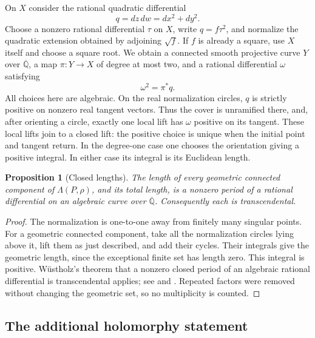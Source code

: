 \documentclass[11pt,a4paper]{article}
\newtheorem{proposition}[theorem]{Proposition}
\theoremstyle{definition}
\theoremstyle{remark}
\numberwithin{equation}{section}
\newcommand{\Qbar}{\overline{\mathbb Q}}
\begin{document}
On $X$ consider the rational quadratic differential
\begin{equation}\label{lm-quadratic}
 q=dz\,dw=dx^2+dy^2.
\end{equation}
Choose a nonzero rational differential $\tau$ on $X$, write
$q=f\tau^2$, and normalize the quadratic extension obtained by adjoining
$\sqrt f$.  If $f$ is already a square, use $X$ itself and choose a square
root.  We obtain a connected smooth projective curve $Y$ over $\Qbar$, a
map $\pi:Y\to X$ of degree at most two, and a rational differential
$\omega$ satisfying
\begin{equation}\label{lm-square}
 \omega^2=\pi^*q.
\end{equation}
All choices here are algebraic.  On the real normalization circles,
$q$ is strictly positive on nonzero real tangent vectors.  Thus the cover
is unramified there, and, after orienting a circle, exactly one local lift
has $\omega$ positive on its tangent.  These local lifts join to a closed
lift: the positive choice is unique when the initial point and tangent
return.  In the degree-one case one chooses the orientation giving a
positive integral.  In either case its integral is its Euclidean length.

\begin{proposition}[Closed lengths]\label{lm-closed-lengths}
The length of every geometric connected component of
$\Lambda(P,\rho)$, and its total length, is a nonzero period of a rational
differential on an algebraic curve over $\Qbar$.  Consequently each is
transcendental.
\end{proposition}

\begin{proof}
The normalization is one-to-one away from finitely many singular points.
For a geometric connected component, take all the normalization circles
lying above it, lift them as just described, and add their cycles.  Their
integrals give the geometric length, since the exceptional finite set has
length zero.  This integral is positive.  W\"ustholz's theorem that a
nonzero closed period of an algebraic rational differential is
transcendental applies; see \cite[Theorem~8.14]{lm-Tamiozzo} and
\cite{lm-HuberWustholz}.  Repeated factors were removed without changing
the geometric set, so no multiplicity is counted.
\end{proof}

\subsection{The additional holomorphy statement}
\end{document}
